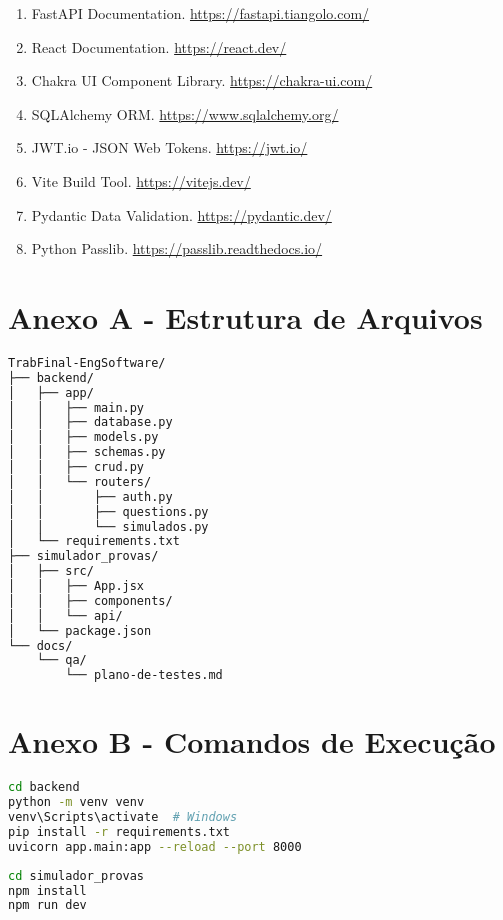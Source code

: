 \documentclass[12pt,a4paper]{article}
\begin{document}
\begin{enumerate}
    \item FastAPI Documentation. \url{https://fastapi.tiangolo.com/}
    \item React Documentation. \url{https://react.dev/}
    \item Chakra UI Component Library. \url{https://chakra-ui.com/}
    \item SQLAlchemy ORM. \url{https://www.sqlalchemy.org/}
    \item JWT.io - JSON Web Tokens. \url{https://jwt.io/}
    \item Vite Build Tool. \url{https://vitejs.dev/}
    \item Pydantic Data Validation. \url{https://pydantic.dev/}
    \item Python Passlib. \url{https://passlib.readthedocs.io/}
\end{enumerate}

\appendix

\section{Anexo A - Estrutura de Arquivos}

\begin{lstlisting}[language=bash, caption=Estrutura do projeto]
TrabFinal-EngSoftware/
├── backend/
│   ├── app/
│   │   ├── main.py
│   │   ├── database.py
│   │   ├── models.py
│   │   ├── schemas.py
│   │   ├── crud.py
│   │   └── routers/
│   │       ├── auth.py
│   │       ├── questions.py
│   │       └── simulados.py
│   └── requirements.txt
├── simulador_provas/
│   ├── src/
│   │   ├── App.jsx
│   │   ├── components/
│   │   └── api/
│   └── package.json
└── docs/
    └── qa/
        └── plano-de-testes.md
\end{lstlisting}

\section{Anexo B - Comandos de Execução}

\begin{lstlisting}[language=bash, caption=Setup do backend]
cd backend
python -m venv venv
venv\Scripts\activate  # Windows
pip install -r requirements.txt
uvicorn app.main:app --reload --port 8000
\end{lstlisting}

\begin{lstlisting}[language=bash, caption=Setup do frontend]
cd simulador_provas
npm install
npm run dev
\end{lstlisting}
\end{document}
